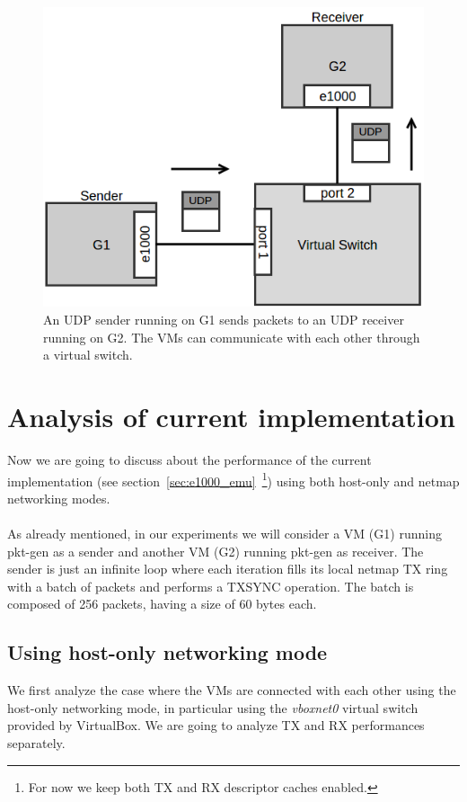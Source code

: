 \documentclass[a4paper, 12pt, titlepage]{report}
\begin{document}
\begin{figure}[!ht]
	\centering
	\includegraphics[scale=0.5]{img/g2g_comm.png}
	\caption{An UDP sender running on G1 sends packets to an UDP receiver running on G2. The VMs can communicate with each other through a virtual switch.}
	\label{img:g2g_comm}
\end{figure}
\section{Analysis of current implementation}
Now we are going to discuss about the performance of the current implementation (see section~\ref{sec:e1000_emu}~\footnote{For now we keep both TX and RX descriptor caches enabled.}) using both host-only and netmap networking modes.
\\
\\
As already mentioned, in our experiments we will consider a VM (G1) running pkt-gen as a sender and another VM (G2) running pkt-gen as receiver. The sender is just an infinite loop where each iteration fills its local netmap TX ring with a batch of packets and performs a TXSYNC operation. The batch is composed of 256 packets, having a size of 60 bytes each. 
\subsection{Using host-only networking mode}
We first analyze the case where the VMs are connected with each other using the host-only networking mode, in particular using the \textit{vboxnet0} virtual switch provided by VirtualBox. We are going to analyze TX and RX performances separately.
\end{document}
